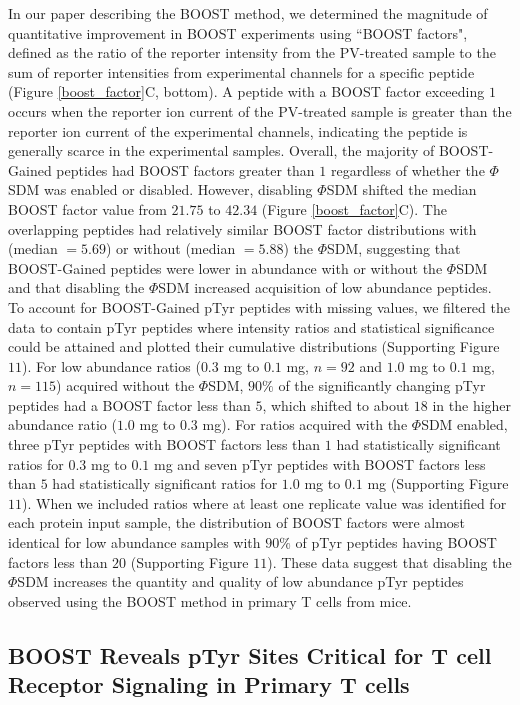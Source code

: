 \documentclass[journal=jprobs,manuscript=article]{achemso}
\begin{document}
In our paper describing the BOOST method, we determined the magnitude of quantitative improvement in BOOST experiments using ``BOOST factors", defined as the ratio of the reporter intensity from the PV-treated sample to the sum of reporter intensities from experimental channels for a specific peptide (Figure \ref{boost_factor}C, bottom)\cite{chua2020tandem}. A peptide with a BOOST factor exceeding $1$ occurs when the reporter ion current of the PV-treated sample is greater than the reporter ion current of the experimental channels, indicating the peptide is generally scarce in the experimental samples\cite{chua2020tandem}. Overall, the majority of BOOST-Gained peptides had BOOST factors greater than $1$ regardless of whether the $\Phi$SDM was enabled or disabled. However, disabling $\Phi$SDM shifted the median BOOST factor value from $21.75$ to $42.34$ (Figure \ref{boost_factor}C). The overlapping peptides had  relatively similar BOOST factor distributions with (median $=5.69$) or without (median $=5.88$) the $\Phi$SDM, suggesting that BOOST-Gained peptides were lower in abundance with or without the $\Phi$SDM and that disabling the $\Phi$SDM increased acquisition of low abundance peptides. To account for BOOST-Gained pTyr peptides with missing values, we filtered the data to contain pTyr peptides where intensity ratios and statistical significance could be attained and plotted their cumulative distributions (Supporting Figure $11$). For low abundance ratios ($0.3$ mg to $0.1$ mg, $n=92$ and $1.0$ mg to $0.1$ mg, $n=115$) acquired without the $\Phi$SDM, $90\%$ of the significantly changing pTyr peptides had a BOOST factor less than $5$, which shifted to about $18$ in the higher abundance ratio ($1.0$ mg to $0.3$ mg). For ratios acquired with the $\Phi$SDM enabled, three pTyr peptides with BOOST factors less than $1$ had statistically significant ratios for $0.3$ mg to $0.1$ mg and seven pTyr peptides with BOOST factors less than $5$ had statistically significant ratios for $1.0$ mg to $0.1$ mg (Supporting Figure $11$). When we included ratios where at least one replicate value was identified for each protein input sample, the distribution of BOOST factors were almost identical for low abundance samples with $90\%$ of pTyr peptides having BOOST factors less than $20$ (Supporting Figure $11$). These data suggest that disabling the $\Phi$SDM increases the quantity and quality of low abundance pTyr peptides observed using the BOOST method in primary T cells from mice.

\subsection{BOOST Reveals pTyr Sites Critical for T cell Receptor Signaling in Primary T cells}
\end{document}
